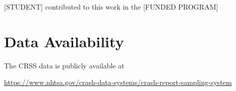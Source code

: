 \documentclass[fleqn]{cas-sc}
\begin{document}
[STUDENT]
contributed to this work in the 
[FUNDED PROGRAM]

\section*{Data Availability}

The CRSS data is publicly available at 

\url{https://www.nhtsa.gov/crash-data-systems/crash-report-sampling-system}


\begin{comment}
\begin{figure}[<options>]
	\centering
		\texttt{[image: ]}
	  \caption{}\label{fig1}
\end{figure}


\begin{table}[<options>]
\caption{}\label{tbl1}
\begin{tabular*}{\tblwidth}{@{}LL@{}}
\toprule
  &  \\ %
\midrule
 & \\
 & \\
 & \\
 & \\
\bottomrule
\end{tabular*}
\end{table}
\end{comment}




\section{}\label{}

\printcredits

%





\begin{comment}
\bio{}
\endbio

\bio{pic1}
\endbio
\end{comment}
\end{document}
